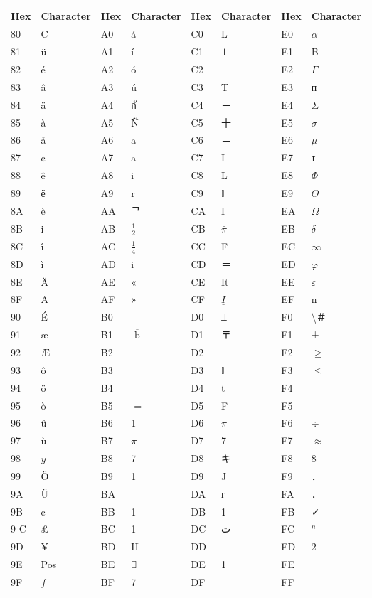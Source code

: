 \documentclass[10pt]{book}
\begin{document}
\begin{center}
\begin{tabular}{|l|l|l|l|l|l|l|l|}
\hline
Hex & Character & Hex & Character & Hex & Character & Hex & Character \\
\hline
80 & C & A0 & á & C0 & L & E0 & $\alpha$ \\
\hline
81 & ü & A1 & í & C1 & ⟂ & E1 & B \\
\hline
82 & é & A2 & ó & C2 &  & E2 & $\Gamma$ \\
\hline
83 & â & A3 & ú & C3 & T & E3 & п \\
\hline
84 & ä & A4 & กั & C4 & － & E4 & $\Sigma$ \\
\hline
85 & à & A5 & Ñ & C5 & 十 & E5 & $\sigma$ \\
\hline
86 & å & A6 & a & C6 & ＝ & E6 & $\mu$ \\
\hline
87 & ¢ & A7 & a & C7 & I & E7 & τ \\
\hline
88 & ê & A8 & i & C8 & L & E8 & $\Phi$ \\
\hline
89 & ё & A9 & r & C9 & $\mathbb{I}$ & E9 & $\Theta$ \\
\hline
8A & è & AA & ᄀ & CA & I & EA & $\Omega$ \\
\hline
8B & i & AB & $\frac{1}{2}$ & CB & $\bar{\pi}$ & EB & $\delta$ \\
\hline
8C & î & AC & $\frac{1}{4}$ & CC & F & EC & $\infty$ \\
\hline
8D & ì & AD & i & CD & ＝ & ED & $\varphi$ \\
\hline
8E & Ä & AE & « & CE & It & EE & $\varepsilon$ \\
\hline
8F & A & AF & » & CF & $\underline{I}$ & EF & n \\
\hline
90 & É & B0 &  & D0 & ⫫ & F0 & \textbackslash ＃ \\
\hline
91 & æ & B1 & $\overline{\text { b }}$ & D1 & 〒 & F1 & ± \\
\hline
92 & Æ & B2 &  & D2 &  & F2 & $\geq$ \\
\hline
93 & ô & B3 &  & D3 & $\mathbb{I}$ & F3 & $\leq$ \\
\hline
94 & ö & B4 &  & D4 & t & F4 &  \\
\hline
95 & ò & B5 & $=$ & D5 & F & F5 &  \\
\hline
96 & û & B6 & 1 & D6 & $\pi$ & F6 & $\div$ \\
\hline
97 & ù & B7 & $\pi$ & D7 & 7 & F7 & $\approx$ \\
\hline
98 & $\ddot{y}$ & B8 & 7 & D8 & キ & F8 & 8 \\
\hline
99 & Ö & B9 & 1 & D9 & J & F9 & ． \\
\hline
9A & Ü & BA &  & DA & г & FA & ． \\
\hline
9B & ¢ & BB & 1 & DB & 1 & FB & ✓ \\
\hline
9 C & £ & BC & 1 & DC & ت & FC & ${ }^{n}$ \\
\hline
9D & ¥ & BD & II & DD &  & FD & 2 \\
\hline
9E & Pos & BE & $\exists$ & DE & 1 & FE & － \\
\hline
9F & $f$ & BF & 7 & DF &  & FF &  \\
\hline
\end{tabular}
\end{center}
\end{document}
